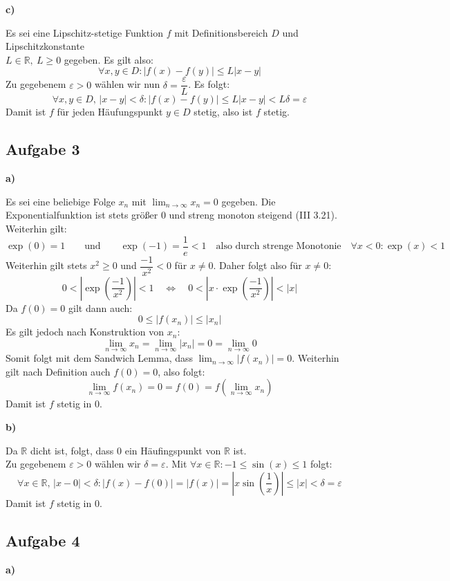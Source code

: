 \documentclass[a4paper,graphics,11pt]{article}
\newcommand{\aufgabe}[1]{\subsection*{Aufgabe #1}}
\begin{document}
\textbf{c)}

Es sei eine Lipschitz-stetige Funktion $f$ mit Definitionsbereich $D$ und Lipschitzkonstante\\
$L \in \mathbb{R},\ L \geq 0$ gegeben. Es gilt also:
$$
    \forall x,y \in D\colon
    |f(x)-f(y)| \leq L|x-y|
$$
Zu gegebenem $\varepsilon > 0$ wählen wir nun $\delta = \dfrac{\varepsilon}{L}$. Es folgt:
$$
    \forall x,y \in D,\,|x-y| < \delta \colon
    |f(x)-f(y)| \leq L|x-y| < L \delta = \varepsilon
$$
Damit ist $f$ für jeden Häufungspunkt $y \in D$ stetig, also ist $f$ stetig.


\aufgabe{3}
\textbf{a)}

Es sei eine beliebige Folge $x_n$ mit $\lim_{n \to \infty}\limits x_n = 0$ gegeben.
Die Exponentialfunktion ist stets größer 0 und streng monoton steigend (III 3.21).
Weiterhin gilt:
$$
    \exp(0) = 1
    \qquad\text{und}\qquad
    \exp(-1) = \frac{1}{e} < 1
    \quad\text{also durch strenge Monotonie}\quad
    \forall x < 0 \colon \exp(x) < 1
$$
Weiterhin gilt stets $x^2 \geq 0$ und $\dfrac{-1}{x^2} < 0$ für $x\neq 0$.
Daher folgt also für $x \neq 0\colon$
$$
    0 < \left|\exp\left(\frac{-1}{x^2}\right)\right| < 1
    \quad \Longleftrightarrow\quad
    0 < \left|x\cdot\exp\left(\frac{-1}{x^2}\right)\right| < |x|
$$
Da $f(0) = 0$ gilt dann auch:
$$
    0 \leq |f(x_n)| \leq |x_n|
$$
Es gilt jedoch nach Konstruktion von $x_n\colon$
$$
    \lim_{n \to \infty}\limits x_n
    = \lim_{n \to \infty}\limits |x_n|
    = 0
    = \lim_{n \to \infty}\limits 0
$$
Somit folgt mit dem Sandwich Lemma, dass $\lim_{n \to \infty}\limits |f(x_n)| = 0$.
Weiterhin gilt nach Definition auch $f(0) = 0$, also folgt:
$$
    \lim_{n \to \infty} f(x_n) = 0 = f(0) = f\left(\lim_{n \to \infty} x_n\right)
$$
Damit ist $f$ stetig in 0.

\textbf{b)}

Da $\mathbb{R}$ dicht ist, folgt, dass 0 ein Häufingspunkt von $\mathbb{R}$ ist.\\
Zu gegebenem $\varepsilon > 0$ wählen wir $\delta = \varepsilon$.
Mit $\forall x \in \mathbb{R}\colon -1 \leq \sin(x) \leq 1$ folgt:
$$
    \forall x \in \mathbb{R},\, |x-0| < \delta\colon
    |f(x) - f(0)| = |f(x)| = \left|x \sin\left(\frac{1}{x}\right)\right|
    \leq |x| < \delta = \varepsilon
$$
Damit ist $f$ stetig in 0.

\newpage

\aufgabe{4}
\textbf{a)}
\end{document}
